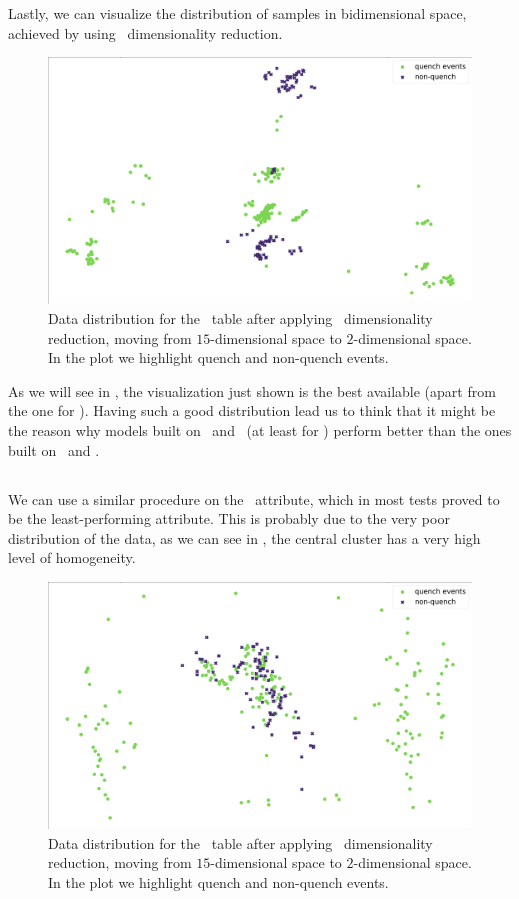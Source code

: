 Lastly, we can visualize the distribution of samples in bidimensional space, achieved by using \pca\
dimensionality reduction.
\begin{figure}[!ht]
	\centering
	\includegraphics[width=0.7\linewidth]{img/An_distribution.png}
	\caption{Data distribution for the \an\ table after applying \pca\ dimensionality reduction,
		moving from $15$-dimensional space to $2$-dimensional space. In the plot we highlight quench
		and non-quench events.} \label{fig:an-dist}
\end{figure}

As we will see in , the visualization just shown is the best available (apart
from the one for \cnmod). Having such a good distribution lead us to think that it might be the reason why
models built on \an\ and \cnmod\ (at least for \qrp) perform better than the ones built on \bn\ and
\phin.

\subsection{\bn}
\label{sec:bn}
We can use a similar procedure on the \bn\ attribute, which in most tests proved to be the
least-performing attribute. This is probably due to the very poor distribution of the data, as we can see in
\Cref{fig:bn-dist}, the central cluster has a very high level of homogeneity.
\begin{figure}[!ht]
	\centering
	\includegraphics[width=0.7\linewidth]{img/Bn_distribution.png}
	\caption{Data distribution for the \bn\ table after applying \pca\ dimensionality
		reduction, moving from $15$-dimensional space to $2$-dimensional space. In the plot
		we highlight quench and non-quench events.} \label{fig:bn-dist}
\end{figure}

